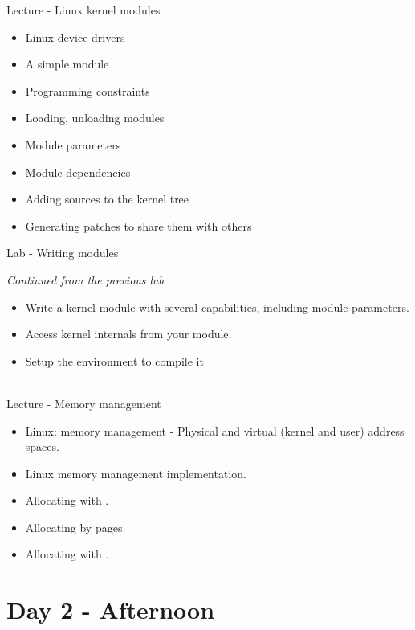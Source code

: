 \documentclass[a4paper,12pt,obeyspaces,spaces,hyphens]{article}
\begin{document}
\feagendatwocolumn
{Lecture - Linux kernel modules}
{
  \begin{itemize}
  \item Linux device drivers
  \item A simple module
  \item Programming constraints
  \item Loading, unloading modules
  \item Module parameters
  \item Module dependencies
  \item Adding sources to the kernel tree
  \item Generating patches to share them with others
  \end{itemize}
}
{Lab - Writing modules}
{
  {\em Continued from the previous lab}
  \begin{itemize}
  \item Write a kernel module with several capabilities, including
    module parameters.
  \item Access kernel internals from your module.
  \item Setup the environment to compile it
  \end{itemize}
}
\\
\feagendaonecolumn
{Lecture - Memory management}
{
  \begin{itemize}
  \item Linux: memory management - Physical and virtual (kernel and user) address spaces.
  \item Linux memory management implementation.
  \item Allocating with .
  \item Allocating by pages.
  \item Allocating with .
  \end{itemize}
}

\section{Day 2 - Afternoon}
\end{document}
